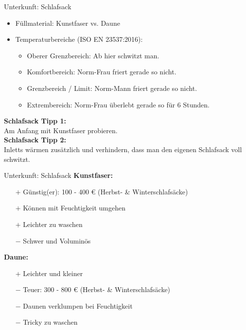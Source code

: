 \documentclass[aspectratio=169]{beamer}
\newcommand{\tipp}[2][Tipp]{\vspace{0.2cm}\textbf{#1:}\\#2}
\begin{document}
			\begin{frame}{Unterkunft: Schlafsack}
				\begin{itemize}
					\item Füllmaterial: Kunstfaser vs. Daune
					\item Temperaturbereiche (ISO EN 23537:2016):
					\begin{itemize}
						\item Oberer Grenzbereich: Ab hier schwitzt man.
						\item Komfortbereich: Norm-Frau friert gerade so nicht.
						\item Grenzbereich / Limit: Norm-Mann friert gerade so nicht.
						\item Extrembereich: Norm-Frau überlebt gerade so für 6 Stunden.
					\end{itemize}
				\end{itemize}
				\tipp[Schlafsack Tipp 1]{Am Anfang mit Kunstfaser probieren.}\\\pause
				\tipp[Schlafsack Tipp 2]{Inletts wärmen zusätzlich und verhindern, dass man den eigenen Schlafsack voll schwitzt.}
			\end{frame}
			
			\begin{frame}{Unterkunft: Schlafsack}
				\textbf{Kunstfaser:}
				\begin{itemize}
					\item[$+$] Günstig(er): 100 - 400 € (Herbst- \& Winterschlafsäcke)
					\item[$+$] Können mit Feuchtigkeit umgehen
					\item[$+$] Leichter zu waschen
					\item[$-$] Schwer und Voluminös
				\end{itemize}\pause
				\textbf{Daune:}
				\begin{itemize}
					\item[$+$] Leichter und kleiner
					\item[$-$] Teuer: 300 - 800 € (Herbst- \& Winterschlafsäcke)
					\item[$-$] Daunen verklumpen bei Feuchtigkeit
					\item[$-$] Tricky zu waschen
				\end{itemize}
			\end{frame}
			
			
\end{document}
